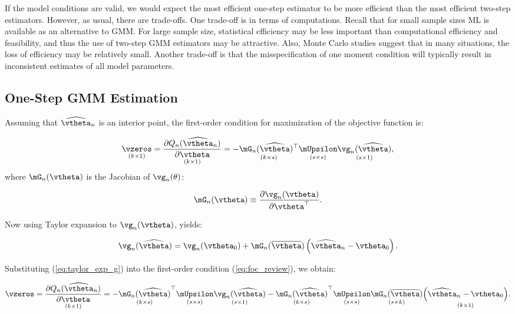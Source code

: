 \documentclass[english,12pt]{book}\usepackage[]{graphicx}\usepackage[]{xcolor}
\begin{document}
If the model conditions are valid, we would expect the most efficient one-step estimator to be more efficient than the most efficient two-step estimators. However, as usual, there are trade-offs. One trade-off is in terms of computations. Recall that for small sample sizes ML is available as an alternative to GMM. For large sample size, statistical efficiency may be less important than computational efficiency and feasibility, and thus the use of two-step GMM estimators may be attractive. Also, Monte Carlo studies suggest that in many situations, the loss of efficiency may be relatively small. Another trade-off is that the misspecification of one moment condition will typically result in inconsistent estimates of all model parameters. 

\subsection{One-Step GMM Estimation}

Assuming that $\widehat{\vtheta}_n$ is an interior point, the first-order condition for maximization of the objective function is:

\begin{equation}\label{eq:foc_review}
  \underset{(k\times 1)}{\vzeros} = \underset{(k\times 1)}{\frac{\partial Q_n(\widehat{\vtheta}_n)}{\partial \vtheta}} = - \underset{(k\times s)}{\mG_n(\widehat{\vtheta})^\top}\underset{(s\times s)}{\mUpsilon}\underset{(s\times 1)}{\vg_n(\widehat{\vtheta})},
\end{equation}
%
where $\mG_n(\vtheta)$ is the Jacobian of $\vg_n(\theta)$:

\begin{equation*}
  \mG_n(\vtheta) \equiv  \frac{\partial \vg_n(\vtheta)}{\partial \vtheta^\top}.
\end{equation*}

Now using Taylor expansion to $\vg_n(\vtheta)$, yields:

\begin{equation}\label{eq:taylor_exp_g}
  \vg_n(\widehat{\vtheta}) = \vg_n(\vtheta_0) + \mG_n(\overline{\vtheta})\left(\widehat{\vtheta}_n - \vtheta_0\right).
\end{equation}

Substituting (\ref{eq:taylor_exp_g}) into the first-order condition (\ref{eq:foc_review}), we obtain:

\begin{equation*}
  \vzeros = \underset{(k\times 1)}{\frac{\partial Q_n(\widehat{\vtheta}_n)}{\partial \vtheta}} = - \underset{(k\times s)}{\mG_n(\widehat{\vtheta})}^\top\underset{(s\times s)}{\mUpsilon}\underset{(s\times 1)}{\vg_n(\widehat{\vtheta})} - \underset{(k\times s)}{\mG_n(\widehat{\vtheta})}^\top\underset{(s\times s)}{\mUpsilon}\underset{(s\times k)}{\mG_n(\overline{\vtheta})}\underset{(k\times 1)}{\left(\widehat{\vtheta}_n - \vtheta_0\right)}.
\end{equation*}
\end{document}
